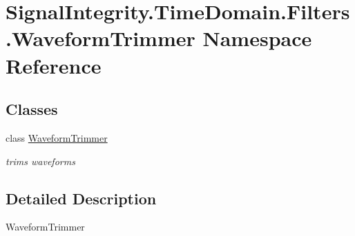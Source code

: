 \hypertarget{namespaceSignalIntegrity_1_1TimeDomain_1_1Filters_1_1WaveformTrimmer}{}\section{Signal\+Integrity.\+Time\+Domain.\+Filters.\+Waveform\+Trimmer Namespace Reference}
\label{namespaceSignalIntegrity_1_1TimeDomain_1_1Filters_1_1WaveformTrimmer}
\subsection*{Classes}
\begin{DoxyCompactItemize}
\item 
class \hyperlink{classSignalIntegrity_1_1TimeDomain_1_1Filters_1_1WaveformTrimmer_1_1WaveformTrimmer}{Waveform\+Trimmer}
\begin{DoxyCompactList}\small\item\em trims waveforms \end{DoxyCompactList}\end{DoxyCompactItemize}


\subsection{Detailed Description}
\begin{DoxyVerb}WaveformTrimmer\end{DoxyVerb}
 
